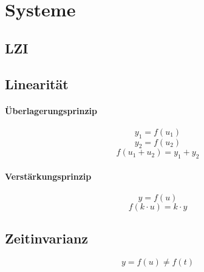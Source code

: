 



\chapter{Systeme}
\newpage

\section{LZI}

\section{Linearität}

\subsubsection{Überlagerungsprinzip}
\[
    y_1 = f(u_1)
\]
\[
    y_2 = f(u_2)
\]
\[
    f(u_1 + u_2) = y_1 + y_2
\]

\subsubsection{Verstärkungsprinzip}
\[
    y = f(u)
\]
\[
    f(k \cdot u) = k \cdot y
\]

\section{Zeitinvarianz}
\[
    y = f(u) \neq f(t)
\]
